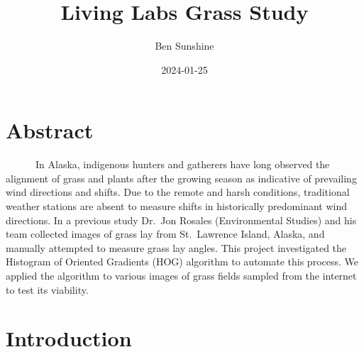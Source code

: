 \documentclass[
  letterpaper,
  DIV=11,
  numbers=noendperiod]{scrreprt}
\title{Living Labs Grass Study}
\author{Ben Sunshine}
\date{2024-01-25}
\renewcommand*\contentsname{Table of contents}
\newcommand\contentsname{Table of contents}
\begin{document}
\maketitle
\ifdefined\Shaded\renewenvironment{Shaded}{\begin{tcolorbox}[boxrule=0pt, borderline west={3pt}{0pt}{shadecolor}, breakable, interior hidden, enhanced, sharp corners, frame hidden]}{\end{tcolorbox}}\fi

\renewcommand*\contentsname{Table of contents}
{
\hypersetup{linkcolor=}
\setcounter{tocdepth}{2}
\tableofcontents
}

\hypertarget{abstract}{%
\chapter{Abstract}\label{abstract}}

~~~~~~In Alaska, indigenous hunters and gatherers have long observed the
alignment of grass and plants after the growing season as indicative of
prevailing wind directions and shifts. Due to the remote and harsh
conditions, traditional weather stations are absent to measure shifts in
historically predominant wind directions. In a previous study Dr.~Jon
Rosales (Environmental Studies) and his team collected images of grass
lay from St.~Lawrence Island, Alaska, and manually attempted to measure
grass lay angles. This project investigated the Histogram of Oriented
Gradients (HOG) algorithm to automate this process. We applied the
algorithm to various images of grass fields sampled from the internet to
test its viability.


\hypertarget{introduction}{%
\chapter{Introduction}\label{introduction}}
\end{document}

